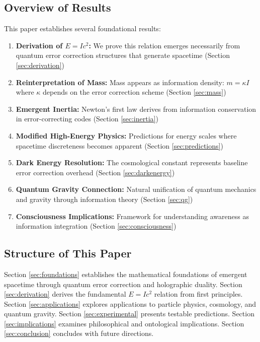 \documentclass[12pt,a4paper]{article}
\theoremstyle{remark}
\begin{document}
\subsection{Overview of Results}

This paper establishes several foundational results:

\begin{enumerate}[leftmargin=*]
\item \textbf{Derivation of $E = Ic^2$:} We prove this relation emerges necessarily from quantum error correction structures that generate spacetime (Section \ref{sec:derivation})

\item \textbf{Reinterpretation of Mass:} Mass appears as information density: $m = \kappa I$ where $\kappa$ depends on the error correction scheme (Section \ref{sec:mass})

\item \textbf{Emergent Inertia:} Newton's first law derives from information conservation in error-correcting codes (Section \ref{sec:inertia})

\item \textbf{Modified High-Energy Physics:} Predictions for energy scales where spacetime discreteness becomes apparent (Section \ref{sec:predictions})

\item \textbf{Dark Energy Resolution:} The cosmological constant represents baseline error correction overhead (Section \ref{sec:darkenergy})

\item \textbf{Quantum Gravity Connection:} Natural unification of quantum mechanics and gravity through information theory (Section \ref{sec:qg})

\item \textbf{Consciousness Implications:} Framework for understanding awareness as information integration (Section \ref{sec:consciousness})
\end{enumerate}

\subsection{Structure of This Paper}

Section \ref{sec:foundations} establishes the mathematical foundations of emergent spacetime through quantum error correction and holographic duality. Section \ref{sec:derivation} derives the fundamental $E = Ic^2$ relation from first principles. Section \ref{sec:applications} explores applications to particle physics, cosmology, and quantum gravity. Section \ref{sec:experimental} presents testable predictions. Section \ref{sec:implications} examines philosophical and ontological implications. Section \ref{sec:conclusion} concludes with future directions.
\end{document}

